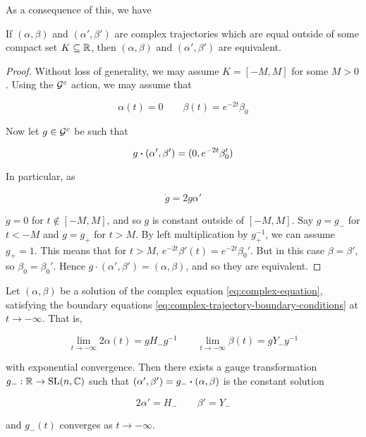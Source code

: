 \documentclass{article}
\begin{document}
As a consequence of this, we have

\begin{lemma}
    \label{lem:complex-trajectory-equal}

    If \((\alpha, \beta)\) and \((\alpha', \beta')\) are complex trajectories which are equal outside of some compact set \(K \subseteq \mathbb{R}\), then \((\alpha, \beta)\) and \((\alpha', \beta')\) are equivalent.
\end{lemma}

\begin{proof}
    Without loss of generality, we may assume \(K = [-M, M]\) for some \(M > 0\). Using the \(\mathcal{G}^c\) action, we may assume that

    \[\alpha(t) = 0 \qquad \beta(t) = e^{-2t}\beta_0\]

    Now let \(g \in \mathcal{G}^c\) be such that

    \[g \vdot (\alpha', \beta') = (0, e^{-2t}\beta_0')\]

    In particular, as

    \[\dot g = 2g\alpha'\]

    \(\dot g = 0\) for \(t \notin [-M, M]\), and so \(g\) is constant outside of \([-M, M]\). Say \(g = g_-\) for \(t < -M\) and \(g = g_+\) for \(t > M\). By left multiplication by \(g_+^{-1}\), we can assume \(g_+ = 1\). This means that for \(t > M\), \(e^{-2t}\beta'(t) = e^{-2t}\beta_0'\). But in this case \(\beta = \beta'\), so \(\beta_0 = \beta_0'\). Hence \(g \cdot (\alpha', \beta') = (\alpha, \beta)\), and so they are equivalent.
\end{proof}

\begin{lemma}
    \label{lem:complex-trajectory-convergence-negative}

    Let \((\alpha, \beta)\) be a solution of the complex equation \cref{eq:complex-equation}, satisfying the boundary equations \cref{eq:complex-trajectory-boundary-conditions} at \(t \to -\infty\). That is,

    \[\lim_{t\to-\infty}2\alpha(t) = gH_-g^{-1} \qquad \lim_{t \to -\infty}\beta(t) = gY_-y^{-1}\]

    with exponential convergence. Then there exists a gauge transformation \(g_- : \mathbb{R} \to \operatorname{SL}(n, \mathbb{C})\) such that \((\alpha', \beta') = g_-\vdot(\alpha, \beta)\) is the constant solution

    \[2\alpha' = H_- \qquad \beta' = Y_-\]

    and \(g_-(t)\) converges as \(t \to -\infty\).
\end{lemma}
\end{document}
